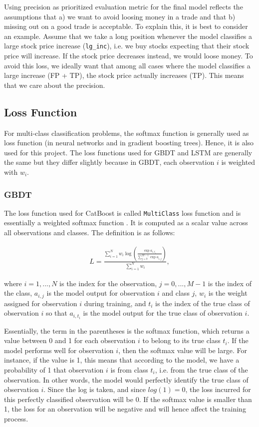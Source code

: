 \documentclass{article}
\begin{document}
	Using precision as prioritized evaluation metric for the final model reflects the assumptions that a) we want to avoid loosing money in a trade and that b) missing out on a good trade is acceptable. To explain this, it is best to consider an example. Assume that we take a long position whenever the model classifies a large stock price increase (\verb|lg_inc|), i.e. we buy stocks expecting that their stock price will increase. If the stock price decreases instead, we would loose money. To avoid this loss, we ideally want that among all cases where the model classifies a large increase (FP + TP), the stock price actually increases (TP). This means that we care about the precision. 
	
	\subsection{Loss Function}
	
	For multi-class classification problems, the softmax function is generally used as loss function (in neural networks and in gradient boosting trees). Hence, it is also used for this project. The loss functions used for GBDT and LSTM are generally the same but they differ slightly because in GBDT, each observation $i$ is weighted with $w_i$.
	
	\subsubsection{GBDT}
	
	The loss function used for CatBoost is called \lstinline{MultiClass} loss function and is essentially a weighted softmax function \cite{noauthor_multiclassification:_nodate}. It is computed as a scalar value across all observations and classes. The definition is as follows:
	
	\begin{align}
	L = \frac{\sum_{i = 1}^N w_i \log \left(\frac{\exp a_{i, t_i}}{\sum_{j = 0}^{M-1} \exp a_{i, j}}\right)}{\sum_{i = 1}^N w_i}, 
	\end{align}
	
	where $i = 1, ..., N$ is the index for the observation, $j = 0, ..., M-1$ is the index of the class, $a_{i, j}$ is the model output for observation $i$ and class $j$, $w_i$ is the weight assigned for observation $i$ during training, and $t_i$ is the index of the true class of observation $i$ so that $a_{i, t_i}$ is the model output for the true class of observation $i$.
	
	Essentially, the term in the parentheses is the softmax function, which returns a value between 0 and 1 for each observation $i$ to belong to its true class $t_i$. If the model performs well for observation $i$, then the softmax value will be large. For instance, if the value is 1, this means that according to the model, we have a probability of 1 that observation $i$ is from class $t_i$, i.e. from the true class of the observation. In other words, the model would perfectly identify the true class of observation $i$. Since the log is taken, and since $log(1)=0$, the loss incurred for this perfectly classified observation will be 0. If the softmax value is smaller than 1, the loss for an observation will be negative and will hence affect the training process.
	
\end{document}
